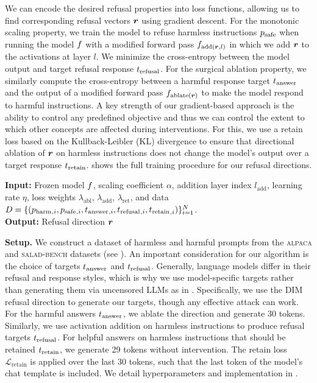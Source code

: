 We can encode the desired refusal properties into loss functions, allowing us to find corresponding refusal vectors ${{\bm{r}}}$ using gradient descent. For the monotonic scaling property, we train the model to refuse harmless instructions ${{p}_{\text{safe}}}$ when running the model $f$ with a modified forward pass $f_{\text{add}({{\bm{r}}}, l)}$ in which we add ${{\bm{r}}}$ to the activations at layer $l$. We minimize the cross-entropy between the model output and target refusal response ${t_{\text{refusal}}}$. For the surgical ablation property, we similarly compute the cross-entropy between a harmful response target ${t_{\text{answer}}}$ and the output of a modified forward pass $f_{\text{ablate}({{\bm{r}}})}$ to make the model respond to harmful instructions. A key strength of our gradient-based approach is the ability to control any predefined objective and thus we can control the extent to which other concepts are affected during interventions. For this, we use a retain loss based on the Kullback-Leibler (KL) divergence to ensure that directional ablation of ${{\bm{r}}}$ on harmless instructions does not change the model's output over a target response ${t_{\text{retain}}}$.  shows the full training procedure for our refusal directions. %

\begin{algorithm}[t]
\caption{\ours (\oursacro)}%
\label{algo:single_direction}
\textbf{Input:} Frozen model $f$, %
scaling coefficient $\alpha$, addition layer index $l_{\text{add}}$, learning rate $\eta$, loss weights $\lambda_{\text{abl}}$, $\lambda_{\text{add}}$, $\lambda_{\text{ret}}$, and data $D = \{({{p}_{\text{harm}}}{}_{,i}, {{p}_{\text{safe}}}{}_{,i}, {t_{\text{answer}}}{}_{,i}, {t_{\text{refusal}}}{}_{,i},{t_{\text{retain}}}_{,i})\}_{i=1}^N$.\\
\textbf{Output:} Refusal direction ${{\bm{r}}}$\\
\vspace{-10pt}

\end{algorithm}

\textbf{Setup.} 
We construct a dataset of harmless and harmful prompts from the \textsc{alpaca} \cite{alpaca} and \textsc{salad-bench} \cite{li2024salad} datasets (see ). An important consideration for our algorithm is the choice of targets ${t_{\text{answer}}}$ and ${t_{\text{refusal}}}$. Generally, language models differ in their refusal and response styles, which is why we use model-specific targets rather than generating them via uncensored LLMs as in \citet{zou2024improving}. Specifically, we use the DIM refusal direction to generate our targets, though any effective attack can work. For the harmful answers ${t_{\text{answer}}}$, we ablate the \dimacro direction and generate 30 tokens. Similarly, we use activation addition on harmless instructions to produce refusal targets ${t_{\text{refusal}}}$. For helpful answers on harmless instructions that should be retained ${t_{\text{retain}}}$, we generate 29 tokens without intervention. The retain loss $\mathcal{L}_{\text{retain}}$ is applied over the last 30 tokens, such that the last token of the model's chat template is included. We detail hyperparameters and implementation in .

